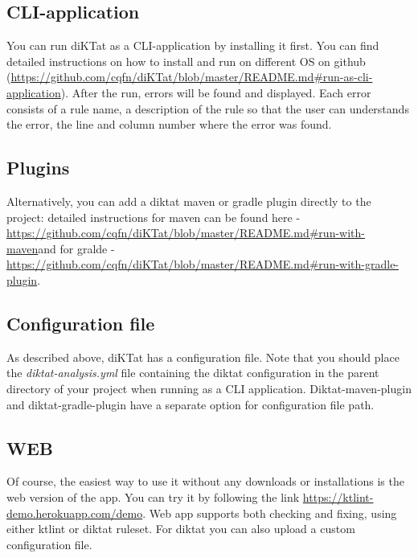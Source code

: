 \subsection{CLI-application}
\par You can run diKTat as a CLI-application by installing it first. You can find detailed instructions on how to install and run on different OS on github (\url{https://github.com/cqfn/diKTat/blob/master/README.md#run-as-cli-application}). After the run, errors will be found and displayed. Each error consists of a rule name, a description of the rule so that the user can understands the error, the line and column number where the error was found.\\
\subsection{Plugins}
\par Alternatively, you can add a diktat maven or gradle plugin directly to the project: detailed instructions for maven can be found here - \url{https://github.com/cqfn/diKTat/blob/master/README.md#run-with-maven}and for gralde - \url{https://github.com/cqfn/diKTat/blob/master/README.md#run-with-gradle-plugin}.\\
\subsection{Configuration file}
As described above, diKTat has a configuration file. Note that you should place the \textsl{diktat-analysis.yml} file containing the diktat configuration in the parent directory of your project when running as a CLI application. Diktat-maven-plugin and diktat-gradle-plugin have a separate option for configuration file path.
\subsection{WEB}
\par Of course, the easiest way to use it without any downloads or installations is the web version of the app. You can try it by following the link \url{https://ktlint-demo.herokuapp.com/demo}. Web app supports both checking and fixing, using either ktlint or diktat ruleset. For diktat you can also upload a custom configuration file.
